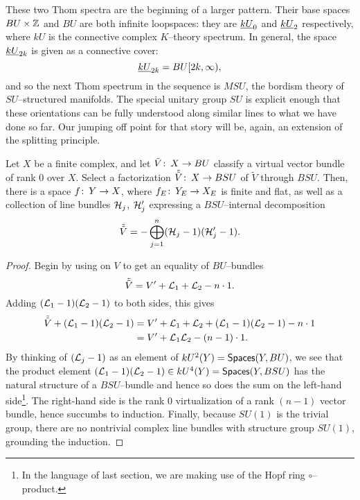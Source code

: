 These two Thom spectra are the beginning of a larger pattern.  Their base spaces $BU \times \mathbb Z$ and $BU$ are both infinite loopspaces: they are $\underline{\smash{kU}}_{0}$ and $\underline{\smash{kU}}_{2}$ respectively, where $kU$ is the connective complex $K$--theory spectrum.  In general, the space $\underline{\smash{kU}}_{2k}$ is given as a connective cover: \[\underline{\smash{kU}}_{2k} = BU[2k, \infty),\] and so the next Thom spectrum in the sequence is $MSU$, the bordism theory of $SU$--structured manifolds.  The special unitary group $SU$ is explicit enough that these orientations can be fully understood along similar lines to what we have done so far.  Our jumping off point for that story will be, again, an extension of the splitting principle.
\begin{lemma}\label{SplittingPrincipleForBSU}
Let $X$ be a finite complex, and let $\tilde V\colon\thinspace X \to BU$ classify a virtual vector bundle of rank $0$ over $X$.  Select a factorization $\tilde{\tilde V}\colon\thinspace X \to BSU$ of $\tilde V$ through $BSU$.  Then, there is a space $f\colon\thinspace Y \to X$, where $f_E\colon\thinspace Y_E \to X_E$ is finite and flat, as well as a collection of line bundles $\mathcal{H}_j$, $\mathcal{H}'_j$ expressing a $BSU$--internal decomposition \[\tilde{\tilde V} = -\bigoplus_{j=1}^n (\mathcal{H}_j - 1)(\mathcal{H}'_j - 1).\]
\end{lemma}
\begin{proof}
Begin by using  on $V$ to get an equality of $BU$--bundles \[\tilde{\tilde V} = V' + \mathcal{L}_1 + \mathcal{L}_2 - n \cdot 1.\]  Adding $(\mathcal{L}_1 - 1)(\mathcal{L}_2 - 1)$ to both sides, this gives
\begin{align*}
\tilde{\tilde V} + (\mathcal{L}_1 - 1)(\mathcal{L}_2 - 1) & = V' + \mathcal{L}_1 + \mathcal{L}_2 + (\mathcal{L}_1 - 1)(\mathcal{L}_2 - 1) - n \cdot 1 \\
& = V' + \mathcal{L}_1\mathcal{L}_2 - (n-1) \cdot 1.
\end{align*}
By thinking of $(\mathcal{L}_j - 1)$ as an element of $kU^2(Y) = \mathsf{Spaces}(Y, BU)$, we see that the product element $(\mathcal{L}_1 - 1)(\mathcal{L}_2 - 1) \in kU^4(Y) = \mathsf{Spaces}(Y, BSU)$ has the natural structure of a $BSU$--bundle and hence so does the sum on the left-hand side\footnote{In the language of last section, we are making use of the Hopf ring $\circ$--product.}.  The right-hand side is the rank $0$ virtualization of a rank $(n-1)$ vector bundle, hence succumbs to induction.  Finally, because $SU(1)$ is the trivial group, there are no nontrivial complex line bundles with structure group $SU(1)$, grounding the induction.
\end{proof}

